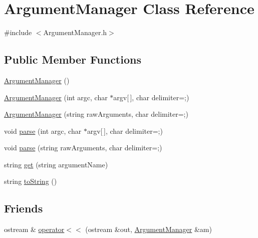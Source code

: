 \hypertarget{class_argument_manager}{}\section{Argument\+Manager Class Reference}
\label{class_argument_manager}


{\ttfamily \#include $<$Argument\+Manager.\+h$>$}

\subsection*{Public Member Functions}
\begin{DoxyCompactItemize}
\item 
\mbox{\hyperlink{class_argument_manager_aa0d0951b70d1939c877aa5cb79695e86}{Argument\+Manager}} ()
\item 
\mbox{\hyperlink{class_argument_manager_a8c2ae105bf878b4d4483db3b7afd0b72}{Argument\+Manager}} (int argc, char $\ast$argv\mbox{[}$\,$\mbox{]}, char delimiter=\textquotesingle{};\textquotesingle{})
\item 
\mbox{\hyperlink{class_argument_manager_a32ab1be3a81b8b0147e4f20b9d44b016}{Argument\+Manager}} (string raw\+Arguments, char delimiter=\textquotesingle{};\textquotesingle{})
\item 
void \mbox{\hyperlink{class_argument_manager_a7fd75ff6c3d370e5e06ebae4f2b71ba1}{parse}} (int argc, char $\ast$argv\mbox{[}$\,$\mbox{]}, char delimiter=\textquotesingle{};\textquotesingle{})
\item 
void \mbox{\hyperlink{class_argument_manager_a71f2f730b1f5d45fe303786054f85119}{parse}} (string raw\+Arguments, char delimiter=\textquotesingle{};\textquotesingle{})
\item 
string \mbox{\hyperlink{class_argument_manager_a0ff9fea600ee22142a49088329838aa5}{get}} (string argument\+Name)
\item 
string \mbox{\hyperlink{class_argument_manager_aaede6a26bd07494cfd93be886de1fe9c}{to\+String}} ()
\end{DoxyCompactItemize}
\subsection*{Friends}
\begin{DoxyCompactItemize}
\item 
ostream \& \mbox{\hyperlink{class_argument_manager_aa33297e8cc199bd084f6427cd7031dd7}{operator$<$$<$}} (ostream \&out, \mbox{\hyperlink{class_argument_manager}{Argument\+Manager}} \&am)
\end{DoxyCompactItemize}


